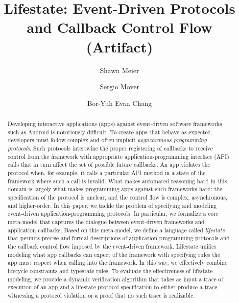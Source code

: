 \documentclass[a4paper,UKenglish]{darts-v2019}
\title{Lifestate: Event-Driven Protocols and Callback Control Flow (Artifact)}
\author{Shawn Meier}{University of Colorado Boulder, USA\and \url{https://plv.colorado.edu/shawn/} }{shawn.meier@colorado.edu}{https://orcid.org/0000-0002-1349-4316}{}
\author{Sergio Mover}{École Polytechnique, France\and \url{http://www.sergiomover.eu/}}{sergio.mover@lix.polytechnique.fr}{https://orcid.org/0000-0003-1029-9547}{}
\author{Bor-Yuh Evan Chang}{University of Colorado Boulder, USA\and \url{https://www.cs.colorado.edu/~bec/} }{evan.chang@colorado.edu}{https://orcid.org/0000-0002-1954-0774}{}%
\begin{document}
%
\maketitle

\begin{abstract}
Developing interactive applications (apps) against event-driven software frameworks such as Android is notoriously difficult.
To create apps that behave as expected, developers must follow complex and often implicit \emph{asynchronous programming protocols}.
Such protocols intertwine the proper registering of callbacks to receive control from the framework with appropriate application-programming interface (API) calls that in turn affect the set of possible future callbacks.
An app violates
the protocol
when, for example, it calls a particular API method in a state of the framework where such a call is invalid.
What makes
automated reasoning hard in this domain is
largely what makes programming apps against such frameworks hard: the
specification of the protocol is unclear, and the control flow is complex, asynchronous, and higher-order.
In this paper, we tackle the problem of specifying and modeling
event-driven application-programming protocols.
In particular, we formalize a core meta-model that captures the
dialogue between event-driven frameworks and application callbacks.
Based on this
meta-model, we define a language called \emph{lifestate} that permits precise and formal descriptions of 
application-programming protocols and the callback control flow
imposed by the event-driven framework.
Lifestate unifies modeling what app callbacks can expect of the framework with specifying rules the app must respect when calling into the framework. 
In this way, we effectively combine lifecycle constraints and typestate rules.
To evaluate the effectiveness of lifestate modeling,
we provide a dynamic verification algorithm that takes as input a trace of execution of an app and a lifestate protocol specification to either produce a trace witnessing a protocol violation or a proof that no such trace is realizable.
\end{abstract}

\end{document}
